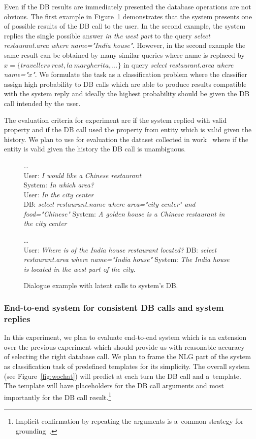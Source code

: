 \documentclass[11pt]{article}
\def\sys#1{{\color{purple}System: \it #1}}
\def\usr#1{{\color{brown}User: \it #1}}
\def\api#1{{\color{green}DB: \it #1}}
\begin{document}
Even if the DB results are immediately presented the database operations are not obvious.  
The first example in Figure~\ref{fig:apicall} demonstrates that the system presents one of possible results of the DB call to the user.
In the second example, the system replies the single possible answer {\it in the west part} to the query {\it select restaurant.area where name="India house"}.
However, in the second example the same result can be obtained by many similar queries where name is replaced by $x=\{travellers\ rest, la\ margherita, \ldots\}$ in query {\it select restaurant.area where name="$x$"}.
We formulate the task as a classification problem where the classifier assign high probability to DB calls which are able to produce results compatible with the system reply and ideally the highest probability should be given the DB call intended by the user.

The evaluation criteria for experiment are if the system replied with valid property and if the DB call used the property from entity which is valid given the history.
We plan to use for evaluation the dataset collected in work~\cite{platek2016wochat} where if the entity is valid given the history the DB call is unambiguous. 
\begin{figure}[!ht]
    \dots \\
    \usr{I would like a Chinese restaurant} \\
    \sys{In which area?} \\
    \usr{In the city center} \\
    \api{select restaurant.name where area="city center" and food="Chinese"}
    \sys{A golden house is a Chinese restaurant in the city center} 

    \dots \\
    \usr{Where is of the India house restaurant located?}
    \api{select restaurant.area where name="India house"}
    \sys{The India house is located in the west part of the city.}
    \caption{Dialogue example with latent calls to system's DB.}
    \label{fig:apicall}
\end{figure}

\subsubsection*{End-to-end system for consistent DB calls and system replies}
In this experiment, we plan to evaluate end-to-end system which is an extension over the previous experiment which should provide us with reasonable accuracy of selecting the right database call.
We plan to frame the NLG part of the system as classification task of predefined templates for its simplicity.
The overall system (see Figure~\ref{fig:wochat}) will predict at each turn the DB call and a~template.
The template will have placeholders for the DB call arguments and most importantly for the DB call result.\footnote{Implicit confirmation by repeating the arguments is a~common strategy for grounding~\cite{meena_crowdsourcing_2014}.}
\end{document}
